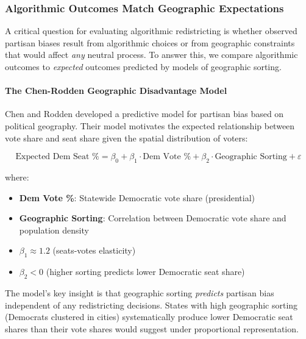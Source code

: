 
\subsubsection{Algorithmic Outcomes Match Geographic Expectations}
\label{sec:expected_seats}

A critical question for evaluating algorithmic redistricting is whether observed partisan biases result from algorithmic choices or from geographic constraints that would affect \textit{any} neutral process. To answer this, we compare algorithmic outcomes to \textit{expected} outcomes predicted by models of geographic sorting.

\paragraph{The Chen-Rodden Geographic Disadvantage Model}

Chen and Rodden \citep{chen2013unintentional} developed a predictive model for partisan bias based on political geography. Their model motivates the expected relationship between vote share and seat share given the spatial distribution of voters:

\begin{equation}
\text{Expected Dem Seat \%} = \beta_0 + \beta_1 \cdot \text{Dem Vote \%} + \beta_2 \cdot \text{Geographic Sorting} + \varepsilon
\end{equation}

where:
\begin{itemize}
\item \textbf{Dem Vote \%}: Statewide Democratic vote share (presidential)
\item \textbf{Geographic Sorting}: Correlation between Democratic vote share and population density
\item $\beta_1 \approx 1.2$ (seats-votes elasticity)
\item $\beta_2 < 0$ (higher sorting predicts lower Democratic seat share)
\end{itemize}

The model's key insight is that geographic sorting \textit{predicts} partisan bias independent of any redistricting decisions. States with high geographic sorting (Democrats clustered in cities) systematically produce lower Democratic seat shares than their vote shares would suggest under proportional representation.

